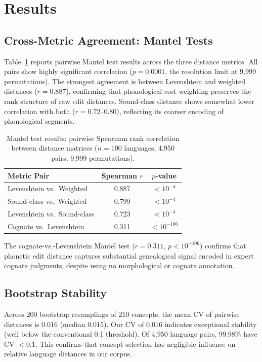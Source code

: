 \documentclass[manuscript]{clv2025}
\begin{document}
\section{Results}
\label{sec:results}

\subsection{Cross-Metric Agreement: Mantel Tests}

Table~\ref{tab:mantel} reports pairwise Mantel test results across the three distance metrics. All pairs show highly significant correlation ($p = 0.0001$, the resolution limit at 9{,}999 permutations). The strongest agreement is between Levenshtein and weighted distances ($r = 0.887$), confirming that phonological cost weighting preserves the rank structure of raw edit distances. Sound-class distance shows somewhat lower correlation with both ($r = 0.72$--$0.80$), reflecting its coarser encoding of phonological segments.

\begin{table}[t]
\centering
\caption{Mantel test results: pairwise Spearman rank correlation between distance matrices ($n = 100$ languages, 4{,}950 pairs; 9{,}999 permutations).}
\label{tab:mantel}
\begin{tabular}{lcc}
\toprule
\textbf{Metric Pair} & \textbf{Spearman $r$} & \textbf{$p$-value} \\
\midrule
Levenshtein vs.\ Weighted    & 0.887 & $< 10^{-4}$ \\
Sound-class vs.\ Weighted    & 0.799 & $< 10^{-4}$ \\
Levenshtein vs.\ Sound-class & 0.723 & $< 10^{-4}$ \\
\midrule
Cognate vs.\ Levenshtein     & 0.311 & $< 10^{-106}$ \\
\bottomrule
\end{tabular}
\end{table}

The cognate-vs.-Levenshtein Mantel test ($r = 0.311$, $p < 10^{-106}$) confirms that phonetic edit distance captures substantial genealogical signal encoded in expert cognate judgments, despite using no morphological or cognate annotation.

\subsection{Bootstrap Stability}

Across 200 bootstrap resamplings of 210 concepts, the mean CV of pairwise distances is $0.016$ (median $0.015$). Our CV of 0.016 indicates exceptional stability (well below the conventional 0.1 threshold). Of 4{,}950 language pairs, 99.98\% have CV $< 0.1$. This confirms that concept selection has negligible influence on relative language distances in our corpus.
\end{document}

